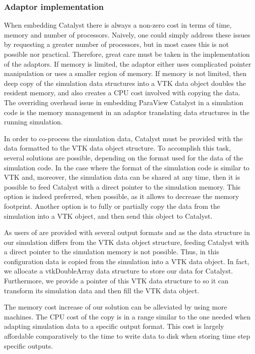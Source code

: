 \subsubsection{Adaptor implementation}
When embedding Catalyst there is always a non-zero cost in terms of time, memory and number of processors. 
Naively, one could simply
address these issues by requesting a greater number of processors, but in most cases this is
not possible nor practical. Therefore, great care must be taken in the implementation of the adaptors.
If memory is limited, the adaptor either uses complicated pointer manipulation or uses a smaller region
of memory. If memory is not limited, then deep copy of the simulation data structures into a VTK
data object doubles the resident memory, and also creates a CPU cost involved with copying the data.
The overriding overhead issue in embedding ParaView Catalyst in a simulation code is the memory
management in an adaptor translating data structures in the running simulation.

In order to co-process the simulation data, Catalyst must be provided with the
data formatted to the VTK data object structure. To accomplish this task, several
solutions are possible, depending on the format used for the data
of the simulation code. In the case where the format of the simulation code is
similar to VTK  and, moreover, the simulation data can be shared at any time,
then it is possible to feed Catalyst with a direct pointer to the simulation
memory. This option is indeed preferred, when possible, as it allows to decrease the memory footprint.
Another option is to fully or partially copy the data from the
simulation into a VTK object, and then send this object to Catalyst.

As users of \CS are provided with several output formats and as the data
structure in our simulation differs from the VTK data object structure, feeding
Catalyst with a direct pointer to the simulation memory is not possible. Thus, in this configuration
data is copied from the simulation into a VTK data object. In fact, we
 allocate a vtkDoubleArray data structure to store our data for Catalyst. Furthermore, we
provide a pointer of this VTK data structure to \CS so it can transform
its simulation data and then fill the VTK data object.

The memory cost increase of our solution can be alleviated by using more
machines. The CPU cost of the copy is in a range similar to the one needed when
adapting simulation data to a specific output format. This cost is largely
affordable comparatively to the time to write data to disk when storing time
step specific outputs. 

